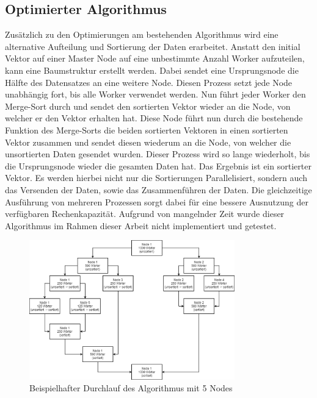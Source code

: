 \subsection{Optimierter Algorithmus}
Zusätzlich zu den Optimierungen am bestehenden Algorithmus wird eine alternative Aufteilung und Sortierung der Daten erarbeitet. Anstatt den initial Vektor auf einer Master Node auf eine unbestimmte Anzahl Worker aufzuteilen, kann eine Baumstruktur erstellt werden. Dabei sendet eine Ursprungsnode die Hälfte des Datensatzes an eine weitere Node. Diesen Prozess setzt jede Node unabhängig fort, bis alle Worker verwendet werden. Nun führt jeder Worker den Merge-Sort durch und sendet den sortierten Vektor wieder an die Node, von welcher er den Vektor erhalten hat. Diese Node führt nun durch die bestehende Funktion des Merge-Sorts die beiden sortierten Vektoren in einen sortierten Vektor zusammen und sendet diesen wiederum an die Node, von welcher die unsortierten Daten gesendet wurden. Dieser Prozess wird so lange wiederholt, bis die Ursprungsnode wieder die gesamten Daten hat. Das Ergebnis ist ein sortierter Vektor. Es werden hierbei nicht nur die Sortierungen Parallelisiert, sondern auch das Versenden der Daten, sowie das Zusammenführen der Daten. Die gleichzeitige Ausführung von mehreren Prozessen sorgt dabei für eine bessere Ausnutzung der verfügbaren Rechenkapazität. Aufgrund von mangelnder Zeit wurde dieser Algorithmus im Rahmen dieser Arbeit nicht implementiert und getestet.
\begin{figure}[!t]
	\centering
	\includegraphics[width=3.5in]{Parallelisierungs_Algorithmus_2.png}
	\caption{Beispielhafter Durchlauf des Algorithmus mit 5 Nodes}
	\label{para_algo2}
\end{figure}